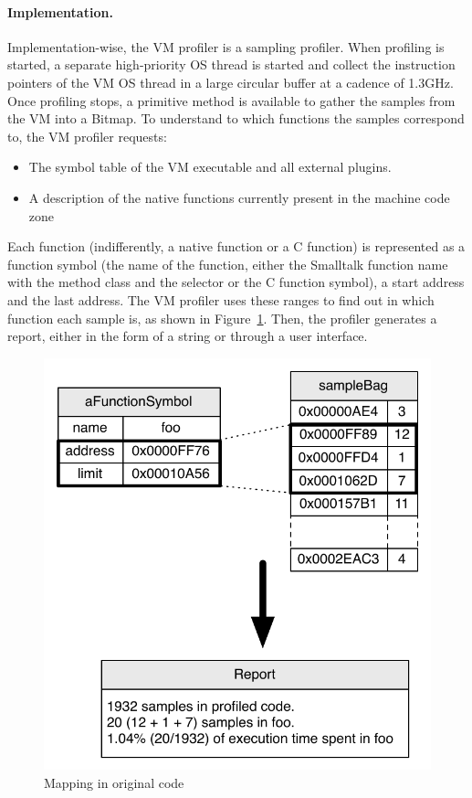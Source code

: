 \documentclass[10pt,preprint]{sigplanconf}
\newcommand{\figlabel}[1]{\label{fig:#1}}
\newcommand{\figref}[1]{Figure~\ref{fig:#1}}
\begin{document}
\paragraph{Implementation.} Implementation-wise, the VM profiler is a sampling profiler. When profiling is started, a separate high-priority OS thread is started and collect the instruction pointers of the VM OS thread in a large circular buffer at a cadence of 1.3GHz. Once profiling stops, a primitive method is available to gather the samples from the VM into a Bitmap. To understand to which functions the samples correspond to, the VM profiler requests:
\begin{itemize}
	\item The symbol table of the VM executable and all external plugins.
	\item A description of the native functions currently present in the machine code zone
\end{itemize}
Each function (indifferently, a native function or a C function) is represented as a function symbol (the name of the function, either the Smalltalk function name with the method class and the selector or the C function symbol), a start address and the last address. The VM profiler uses these ranges to find out in which function each sample is, as shown in \figref{fig:OriginalMapping}. Then, the profiler generates a report, either in the form of a string or through a user interface.

 \begin{figure}[!htp]
     \begin{center}
         \includegraphics[width=0.9\linewidth]{OriginalMapping}
         \caption{Mapping in original code}
         \figlabel{fig:OriginalMapping}
     \end{center}
 \end{figure}
 
\end{document}
